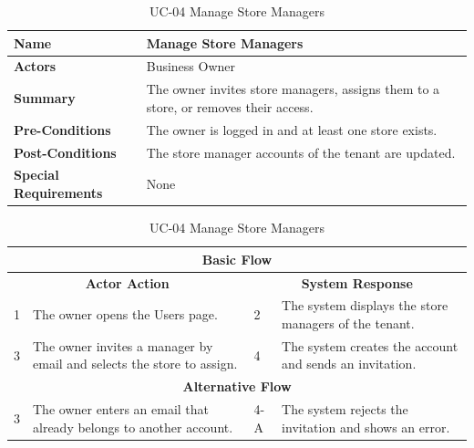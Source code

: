\documentclass{StockSense}
\begin{document}
\begin{table}[!htbp]
\centering
\caption{UC-04 Manage Store Managers}
{\small\linespread{1}\selectfont
\begin{tabular}{|p{}|p{}|}
\hline
\textbf{Name} & Manage Store Managers \\ \hline
\textbf{Actors} & Business Owner \\ \hline
\textbf{Summary} & The owner invites store managers, assigns them to a store, or removes their access. \\ \hline
\textbf{Pre-Conditions} & The owner is logged in and at least one store exists. \\ \hline
\textbf{Post-Conditions} & The store manager accounts of the tenant are updated. \\ \hline
\textbf{Special Requirements} & None \\ \hline
\end{tabular}\par\nointerlineskip
\begin{tabular}{|p{}|p{}|p{}|p{}|}
\multicolumn{4}{|c|}{\textbf{Basic Flow}} \\ \hline
\multicolumn{2}{|c|}{\textbf{Actor Action}} & \multicolumn{2}{c|}{\textbf{System Response}} \\ \hline
1 & The owner opens the Users page. & 2 & The system displays the store managers of the tenant. \\ \hline
3 & The owner invites a manager by email and selects the store to assign. & 4 & The system creates the account and sends an invitation. \\ \hline
\multicolumn{4}{|c|}{\textbf{Alternative Flow}} \\ \hline
3 & The owner enters an email that already belongs to another account. & 4-A & The system rejects the invitation and shows an error. \\ \hline
\end{tabular}\par}
\end{table}
\end{document}
